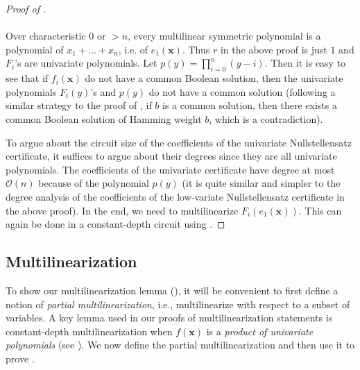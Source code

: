 \documentclass[11pt]{article}
\newcommand{\bigO}{\mathcal{O}}
\begin{document}
\begin{proof}[Proof of ]
\paragraph{}Over characteristic $0$ or $> n$, every multilinear symmetric polynomial is a polynomial of $x_{1}+\ldots+x_{n}$, i.e. of $e_{1}(\mathbf{x})$. Thus $r$ in the above proof is just $1$ and $F_{i}$'s are univariate polynomials. Let $p(y) = \prod_{i=0}^{n} (y-i)$. Then it is easy to see that if $f_{i}(\mathbf{x})$ do not have a common Boolean solution, then the univariate polynomials $F_{i}(y)$'s and $p(y)$ do not have a common solution (following a similar strategy to the proof of , if $b$ is a common solution, then there exists a common Boolean solution of Hamming weight $b$, which is a contradiction).\newline

\noindent
To argue about the circuit size of the coefficients of the univariate Nullstellensatz certificate, it suffices to argue about their degrees since they are all univariate polynomials. The coefficients of the univariate certificate have degree at most $\bigO(n)$ because of the polynomial $p(y)$ (it is quite similar and simpler to the degree analysis of the coefficients of the low-variate Nullstellensatz certificate in the above proof).\newline
In the end, we need to multilinearize $F_{i}(e_{1}(\mathbf{x}))$. This can again be done in a constant-depth circuit using .
\end{proof}

\subsection{Multilinearization}
 To show our multilinearization lemma (), it will be convenient to first define a notion of \emph{partial multilinearization}, i.e., multilinearize with respect to a subset of variables. A key lemma used in our proofs of multilinearization statements is constant-depth multilinearization when $f(\mathbf{x})$ is a \emph{product of univariate polynomials} (see ). We now define the partial multilinearization and then use it to prove .\\
\end{document}
